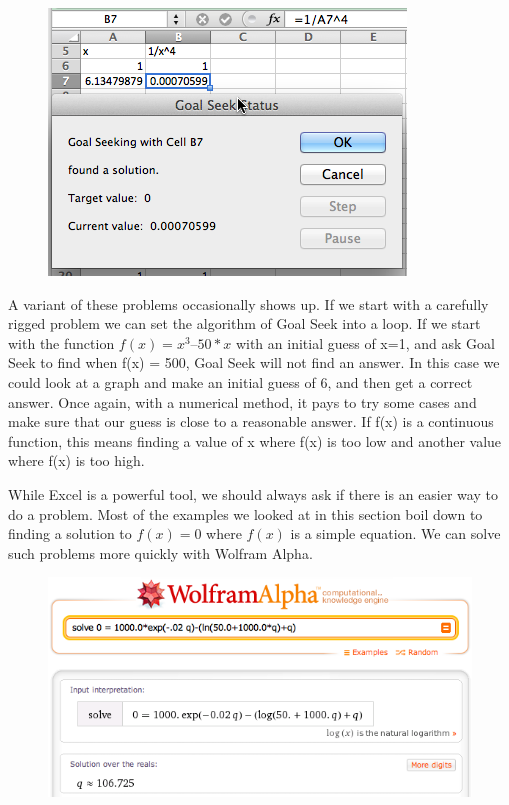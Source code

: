 \documentclass[10pt,]{book}
\theoremstyle{plain}
\theoremstyle{definition}
\theoremstyle{definition}
\begin{document}
  \leavevmode%
\begin{figure}
\centering
\includegraphics[width=0.8\linewidth]{images/sec1-6-15.png}
\end{figure}
 

%
\par

A variant of these problems occasionally shows up.  If we start with a carefully rigged problem we can set the algorithm of Goal Seek into a loop.  If we start with the function \(f(x) = x^3 – 50*x\) with an initial guess of x=1, and ask Goal Seek to find when f(x) = 500,  Goal Seek will not find an answer.  In this case we could look at a graph and make an initial guess of 6, and then get a correct answer.  Once again, with a numerical method, it pays to try some cases and make sure that our guess is close to a reasonable answer.  If f(x) is a continuous function, this means finding a value of x where f(x) is too low and another value where f(x) is too high.

%
\par

While Excel is a powerful tool, we should always ask if there is an easier way to do a problem.  Most of the examples we looked at in this section boil down to finding a solution to \(f(x)=0\) where \(f(x)\) is a simple equation.  We can solve such problems more quickly with Wolfram Alpha.

  \leavevmode%
\begin{figure}
\centering
\includegraphics[width=0.8\linewidth]{images/sec1-6-16.png}
\end{figure}
 
\end{document}
